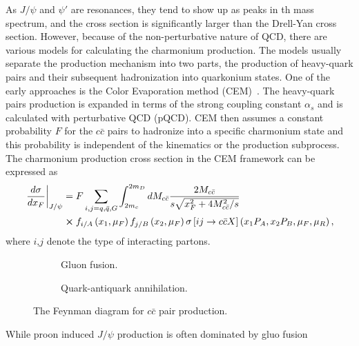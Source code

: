 \documentclass[../main.tex]{subfiles}
\begin{document}
As $J/\psi$ and $\psi'$ are resonances, they tend to show up as peaks in th mass spectrum,
and the cross section is significantly larger than the Drell-Yan cross section.
However, because of the non-perturbative nature of QCD, there are various models for
calculating the charmonium production. The models usually separate the production
mechanism into two parts, the production of heavy-quark pairs and their subsequent
hadronization into quarkonium states. One of the early approaches is the Color
Evaporation method (CEM)~\cite{einhorn1975,bodwin1995}. The heavy-quark
pairs production is expanded in terms of the strong coupling constant $\alpha_s$
and is calculated with perturbative QCD (pQCD). CEM then assumes a constant
probability $F$ for the $c\bar{c}$ pairs to hadronize into a specific charmonium
state and this probability is independent of the kinematics or the production
subprocess. The charmonium production cross section in the CEM framework can be
expressed as
\begin{equation}
	\begin{split}
		\left.\frac{d\sigma}{dx_F}\right|_{J/\psi} &= F \sum_{i,j = q,\bar{q},G}\int^{2m_D}_{2m_c} dM_{c\bar{c}}  \frac{2M_{c\bar{c}}}{s\sqrt{x_F^2+4M_{c\bar{c}}^2/s}}\\
		&\cross f_{i/A}\left(x_1,\mu_F\right)f_{j/B}\left(x_2,\mu_F\right)\sigma\left[ij\rightarrow c\bar{c}X\right]\left(x_1P_A,x_2P_B,\mu_F,\mu_R \right),
	\end{split}
\end{equation}
where $i$,$j$ denote the type of interacting partons. 
\begin{figure}[htpb!]
	\centering
	\begin{subfigure}{0.4\linewidth}
		\begin{subfigure}{\linewidth}
			
		\end{subfigure}
		\begin{subfigure}{\linewidth}
			
		\end{subfigure}
		\caption{Gluon fusion\label{subfig:gluon}.}
	\end{subfigure}
	\quad
	\begin{subfigure}{0.4\linewidth}
		
		\caption{Quark-antiquark annihilation.\label{subfig:qqbar}}
	\end{subfigure}
	\caption{The Feynman diagram for $c\bar{c}$ pair production.}
	\label{fig:charmonium}
\end{figure}
While proon induced $J/\psi$ production is often dominated by gluo fusion
\end{document}

